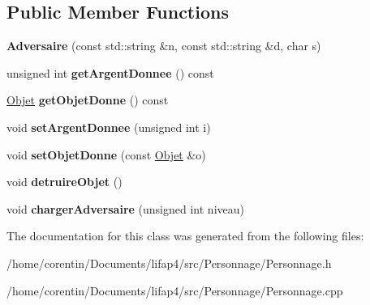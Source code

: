 \subsection*{Public Member Functions}
\begin{DoxyCompactItemize}
\item 
\mbox{\label{class_adversaire_acc1711c4359e7d5be90f46f247bc773c}} 
{\bfseries Adversaire} (const std\+::string \&n, const std\+::string \&d, char s)
\item 
\mbox{\label{class_adversaire_a8b95db33d9233f0edcc2d870cc2242c3}} 
unsigned int {\bfseries get\+Argent\+Donnee} () const
\item 
\mbox{\label{class_adversaire_a9938730269f971643fcd039efcfa0010}} 
\hyperlink{class_objet}{Objet} {\bfseries get\+Objet\+Donne} () const
\item 
\mbox{\label{class_adversaire_ab8371ffdc0fc9a934212e05fbf3fedc2}} 
void {\bfseries set\+Argent\+Donnee} (unsigned int i)
\item 
\mbox{\label{class_adversaire_a96bed950b5172bbda0a2ddab2b1ff68c}} 
void {\bfseries set\+Objet\+Donne} (const \hyperlink{class_objet}{Objet} \&o)
\item 
\mbox{\label{class_adversaire_ac0a12a8a849f87161ccc844cee731374}} 
void {\bfseries detruire\+Objet} ()
\item 
\mbox{\label{class_adversaire_a5540f25c07c308dcc31328501a980c1c}} 
void {\bfseries charger\+Adversaire} (unsigned int niveau)
\end{DoxyCompactItemize}


The documentation for this class was generated from the following files\+:\begin{DoxyCompactItemize}
\item 
/home/corentin/\+Documents/lifap4/src/\+Personnage/Personnage.\+h\item 
/home/corentin/\+Documents/lifap4/src/\+Personnage/Personnage.\+cpp\end{DoxyCompactItemize}
